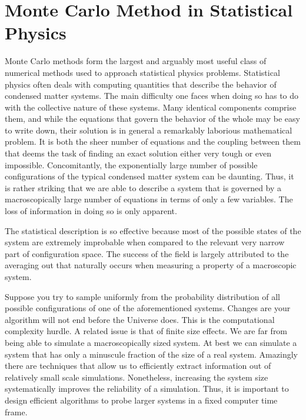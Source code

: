 \section{Monte Carlo Method in Statistical Physics}
\label{sec:classical_mc}

Monte Carlo methods form the largest and arguably most useful class of numerical methods used to approach statistical physics problems.
Statistical physics often deals with computing quantities that describe the behavior of condensed matter systems.
The main difficulty one faces when doing so has to do with the collective nature of these systems.
Many identical components comprise them, and while the equations that govern the behavior of the whole may be easy to write down, their solution is in general a remarkably laborious mathematical problem.
It is both the sheer number of equations and the coupling between them that deems the task of finding an exact solution either very tough or even impossible.
Concomitantly, the exponentially large number of possible configurations of the typical condensed matter system can be daunting.
Thus, it is rather striking that we are able to describe a system that is governed by a macroscopically large number of equations in terms of only a few variables.
The loss of information in doing so is only apparent.

The statistical description is so effective because most of the possible states of the system are extremely improbable when compared to the relevant very narrow part of configuration space.
The success of the field is largely attributed to the averaging out that naturally occurs when measuring a property of a macroscopic system.

Suppose you try to sample uniformly from the probability distribution of all possible configurations of one of the aforementioned systems.
Changes are your algorithm will not end before the Universe does.
This is the computational complexity hurdle.
A related issue is that of finite size effects.
We are far from being able to simulate a macroscopically sized system. 
At best we can simulate a system that has only a minuscule fraction of the size of a real system.
Amazingly there are techniques that allow us to efficiently extract information out of relatively small scale simulations.
Nonetheless, increasing the system size systematically improves the reliability of a simulation.
Thus, it is important to design efficient algorithms to probe larger  systems in a fixed computer time frame.

